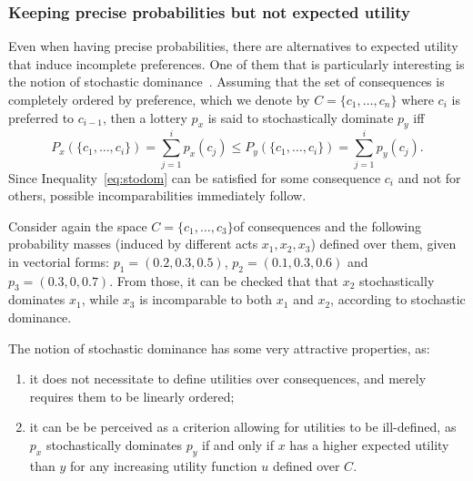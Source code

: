 \documentclass[french, english]{llncs}
\begin{document}
	\subsubsection{Keeping precise probabilities but not expected utility}
	
	Even when having precise probabilities, there are alternatives to expected utility that induce incomplete preferences. One of them that is particularly interesting is the notion of stochastic dominance~\cite{levy_stochastic_1992}. Assuming that the set of consequences is completely ordered by preference, which we denote by $C = \{c_1, …, c_n\}$ where $c_i$ is preferred to $c_{i - 1}$, then a lottery $p_x$ is said to stochastically dominate $p_y$ iff
	\begin{equation}\label{eq:stodom}P_x(\{c_1,\ldots,c_i\})=\sum_{j=1}^i p_x(c_j) \leq P_y(\{c_1,\ldots,c_i\})=\sum_{j=1}^i p_y(c_j).\end{equation}
	Since Inequality~\eqref{eq:stodom} can be satisfied for some consequence $c_i$ and not for others, possible incomparabilities immediately follow. %
	
	\begin{example}
		Consider again the space $C=\{c_1,\ldots,c_3\}$of consequences and the following probability masses (induced by different acts $x_1,x_2,x_3$) defined over them, given in vectorial forms: $p_1=(0.2,0.3,0.5)$, $p_2=(0.1,0.3,0.6)$ and $p_3=(0.3,0,0.7)$. From those, it can be checked that
	 that $x_2$ stochastically dominates $x_1$, while $x_3$ is incomparable to both $x_1$ and $x_2$, according to stochastic dominance.
	\end{example}
	
	The notion of stochastic dominance has some very attractive properties, as:
	\begin{enumerate}
		\item it does not necessitate to define utilities over consequences, and merely requires them to be linearly ordered;
		\item it can be be perceived as a criterion allowing for utilities to be ill-defined, as $p_x$ stochastically dominates $p_y$ if and only if $x$ has a higher expected utility than $y$ for any increasing utility function $u$ defined over $C$. 
	\end{enumerate}
	
\end{document}
